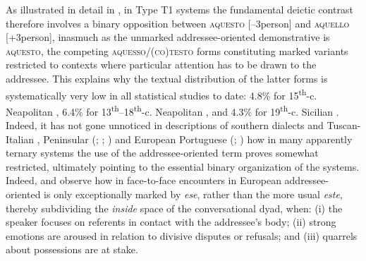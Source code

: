 \documentclass[output=paper]{langsci/langscibook}
\begin{document}
As illustrated in detail in \citet{ledgeway2004sviluppo}, in Type T1 systems
the fundamental deictic contrast therefore involves a binary opposition between
\textsc{aquesto} [–3person] and \textsc{aquello} [+3person], inasmuch as the
unmarked addressee-o\-ri\-en\-ted demonstrative is \textsc{aquesto}, the competing
\textsc{aquesso/(co)testo} forms constituting marked variants restricted to
contexts where particular attention has to be drawn to the addressee. This
explains why the textual distribution of the latter forms is systematically
very low in all statistical studies to date: 4.8\% for
15\textsuperscript{th}{}-c. Neapolitan \citep{Vincent:1999ab}, 6.4\% for
13\textsuperscript{th}–18\textsuperscript{th}{}-c. Neapolitan
\citep[89]{ledgeway2004sviluppo}, and 4.3\% for 19\textsuperscript{th}{}-c.
Sicilian \citep[92]{ledgeway2004sviluppo}. Indeed, it has not gone unnoticed
in descriptions of southern  dialects and Tuscan-Italian
\citep[68--70]{ledgeway2004sviluppo}, Peninsular 
(\citealt[fn.\ 31]{Eguren:1999a}; \citealt[558f]{Eguren:2012a};
\citealt{Gutierrez-Rexach:2002a,Gutierrez-Rexach:2005a}) and
European Portuguese (\citealt{Teyssier:1980a}; \citealt[325]{Salvi:2011ab})
how in many apparently ternary systems the use of the addressee-oriented term
proves somewhat restricted, ultimately pointing to the essential binary
organization of the systems. Indeed,
\citet[§3.1]{Jungbluth:2017a} and
\citet[245f]{Gomez-Sanchez:2015a} observe how in face-to-face encounters in
European  addressee-oriented  is only exceptionally marked by
\emph{ese}, rather than the more usual \emph{este}, thereby subdividing the
\emph{inside} space of the conversational dyad, when: (i) the speaker focuses
on referents in contact with the addressee’s body; (ii) strong emotions are
aroused in relation to divisive disputes or refusals; and (iii) quarrels about
possessions are at stake.
\end{document}
